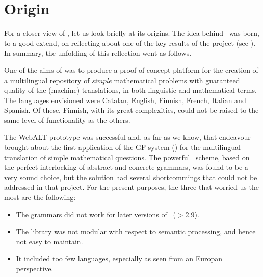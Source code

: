 \documentclass[adraft,copyright,creativecommons]{eptcs}
\begin{document}
\section{Origin}

For a closer view of \MGL, let us look briefly at its origins.  The
idea behind \MGL\ was born, to a good extend, on reflecting about one of
the key results of the \webalt{} project (see
\cite{Caprotti_multilingualdelivery, Caprotti06webalt!deliver}).  In
summary, the unfolding of this reflection went as follows.

One of the aims of \webalt{} was to produce a proof-of-concept
platform for the creation of a multilingual repository of \emph{simple}
mathematical problems with guaranteed quality of the (machine)
translations, in both linguistic and mathematical terms. The languages
envisioned were Catalan,
English,
Finnish,
French,
Italian and
Spanish.
Of these, Finnish, with its great complexities, could not be raised to
the same level of functionality as the others.

The WebALT prototype was successful and, as far as we know, that endeavour
brought about the first application of the GF system (\cite{GF,Ranta11})
for the multilingual translation of simple mathematical questions.  The
powerful \GF\ scheme, based on the perfect interlocking of abstract and
concrete grammars, was found to be a very sound choice, but the solution
had several shortcommings that could not be addressed in that project.
For the present purposes, the three that worried us the most are the
following:
\begin{itemize}
\item
The grammars did not work for later versions of \GF\  ($>$2.9).
\item
The library was not modular with respect to
semantic processing, and hence not easy to maintain.
\item
It included too few languages, especially as seen from an Europan
perspective.
\end{itemize}
\end{document}
